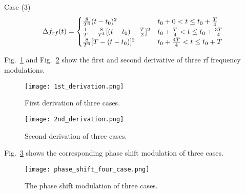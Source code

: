 Case (3) 
\begin{eqnarray}\Delta f_{rf}(t)= 
\begin{cases}
\frac{8}{T^3}(t-t_0)^2&t_0+0<t\le t_0+\frac{T}{4}\cr  
\frac{1}{T}-\frac{8}{T^3}[(t-t_0)-\frac{T}{2}]^2	&t_0+\frac{T}{4}<t\le t_0+\frac{3T}{4}\cr 
\frac{8}{T^3}[T-(t-t_0)]^2	&t_0+\frac{4T}{4}<t\le t_0+T\cr  

\end{cases}
\end{eqnarray}


Fig.~\ref{1st_derivation} and Fig.~\ref{2nd_derivation} show the first and second derivative of three rf frequency modulations.
\begin{figure}[H]
   \centering   
   \texttt{[image: 1st\_derivation.png]}
   \caption{First derivation of three cases.}
   \label{1st_derivation}
\end{figure}
\begin{figure}[H]
   \centering   
   \texttt{[image: 2nd\_derivation.png]}
   \caption{Second derivation of three cases.}
   \label{2nd_derivation}
\end{figure}

Fig.~\ref{phase_shift_four_case} shows the corresponding phase shift modulation of three cases. 
\begin{figure}[H]
   \centering   
   \texttt{[image: phase\_shift\_four\_case.png]}
   \caption{The phase shift modulation of three cases.}
   \label{phase_shift_four_case}
\end{figure}

